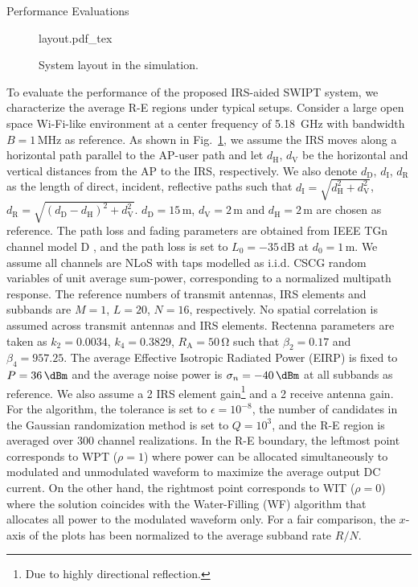 \documentclass[journal]{IEEEtran}
\begin{document}
	\begin{section}{Performance Evaluations}\label{se:performance_evaluation}
		\begin{figure}[!t]
			\centering
			\def\svgwidth{0.9\columnwidth}
			{layout.pdf_tex}
			\caption{System layout in the simulation.}
			\label{fi:layout}
		\end{figure}
		To evaluate the performance of the proposed IRS-aided SWIPT system, we characterize the average R-E regions under typical setups. Consider a large open space Wi-Fi-like environment at a center frequency of \SI{5.18}{\GHz} with bandwidth $B=1\,\si{\MHz}$ as reference. As shown in Fig.~\ref{fi:layout}, we assume the IRS moves along a horizontal path parallel to the AP-user path and let $d_{\mathrm{H}}$, $d_{\mathrm{V}}$ be the horizontal and vertical distances from the AP to the IRS, respectively. We also denote $d_{\mathrm{D}}$, $d_{\mathrm{I}}$, $d_{\mathrm{R}}$ as the length of direct, incident, reflective paths such that $d_{\mathrm{I}}=\sqrt{d_{\mathrm{H}}^2+d_{\mathrm{V}}^2}$, $d_{\mathrm{R}}=\sqrt{(d_{\mathrm{D}}-d_{\mathrm{H}})^2+d_{\mathrm{V}}^2}$. $d_{\mathrm{D}}=15\,\si{\meter}$, $d_{\mathrm{V}}=2\,\si{\meter}$ and $d_{\mathrm{H}}=2\,\si{\meter}$ are chosen as reference. The path loss and fading parameters are obtained from IEEE TGn channel model D \cite{Erceg2004}, and the path loss is set to $L_0=-35\,\si{\dB}$ at $d_0=1\,\si{\meter}$. We assume all channels are NLoS with taps modelled as i.i.d. CSCG random variables of unit average sum-power, corresponding to a normalized multipath response. The reference numbers of transmit antennas, IRS elements and subbands are $M=1$, $L=20$, $N=16$, respectively. No spatial correlation is assumed across transmit antennas and IRS elements. Rectenna parameters are taken as $k_2=0.0034$, $k_4=0.3829$, $R_{\mathrm{A}}=50\,\si{\ohm}$ such that $\beta_2=0.17$ and $\beta_4=957.25$. The average Effective Isotropic Radiated Power (EIRP) is fixed to $P=36\,\si{\dBm}$ and the average noise power is $\sigma_n=-40\,\si{\dBm}$ at all subbands as reference. We also assume a \SI{2}{\dBi} IRS element gain\footnote{Due to highly directional reflection.} and a \SI{2}{\dBi} receive antenna gain. For the algorithm, the tolerance is set to $\epsilon=10^{-8}$, the number of candidates in the Gaussian randomization method is set to $Q=10^{3}$, and the R-E region is averaged over \num{300} channel realizations. In the R-E boundary, the leftmost point corresponds to WPT ($\rho=1$) where power can be allocated simultaneously to modulated and unmodulated waveform to maximize the average output DC current. On the other hand, the rightmost point corresponds to WIT ($\rho=0$) where the solution coincides with the Water-Filling (WF) algorithm that allocates all power to the modulated waveform only. For a fair comparison, the $x$-axis of the plots has been normalized to the average subband rate $R/N$.


\end{section}
\end{document}
